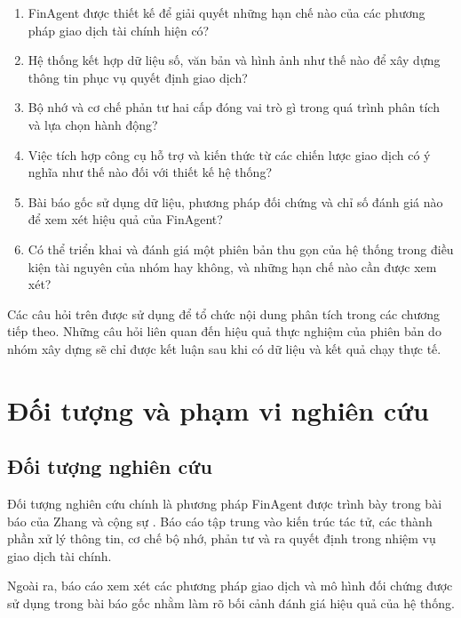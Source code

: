 \begin{enumerate}
    \item FinAgent được thiết kế để giải quyết những hạn chế nào của các phương pháp giao dịch tài chính hiện có?

    \item Hệ thống kết hợp dữ liệu số, văn bản và hình ảnh như thế nào để xây dựng thông tin phục vụ quyết định giao dịch?

    \item Bộ nhớ và cơ chế phản tư hai cấp đóng vai trò gì trong quá trình phân tích và lựa chọn hành động?

    \item Việc tích hợp công cụ hỗ trợ và kiến thức từ các chiến lược giao dịch có ý nghĩa như thế nào đối với thiết kế hệ thống?

    \item Bài báo gốc sử dụng dữ liệu, phương pháp đối chứng và chỉ số đánh giá nào để xem xét hiệu quả của FinAgent?

    \item Có thể triển khai và đánh giá một phiên bản thu gọn của hệ thống trong điều kiện tài nguyên của nhóm hay không, và những hạn chế nào cần được xem xét?
\end{enumerate}

Các câu hỏi trên được sử dụng để tổ chức nội dung phân tích trong các chương tiếp theo. Những câu hỏi liên quan đến hiệu quả thực nghiệm của phiên bản do nhóm xây dựng sẽ chỉ được kết luận sau khi có dữ liệu và kết quả chạy thực tế.

\section{Đối tượng và phạm vi nghiên cứu}

\subsection{Đối tượng nghiên cứu}

Đối tượng nghiên cứu chính là phương pháp FinAgent được trình bày trong bài báo của Zhang và cộng sự \cite{zhang2024finagent}. Báo cáo tập trung vào kiến trúc tác tử, các thành phần xử lý thông tin, cơ chế bộ nhớ, phản tư và ra quyết định trong nhiệm vụ giao dịch tài chính.

Ngoài ra, báo cáo xem xét các phương pháp giao dịch và mô hình đối chứng được sử dụng trong bài báo gốc nhằm làm rõ bối cảnh đánh giá hiệu quả của hệ thống.

